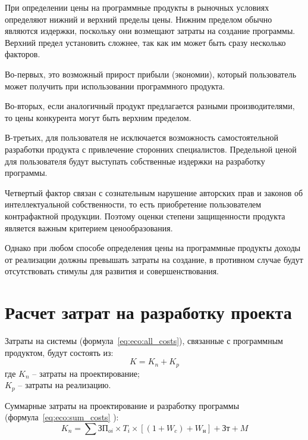 \documentclass[utf8,usehyperref,12pt]{G7-32}
\begin{document}
При определении цены на программные продукты в рыночных условиях определяют нижний и верхний пределы цены. Нижним пределом обычно являются издержки, поскольку они возмещают затраты на создание программы. Верхний предел установить сложнее, так как им может быть сразу несколько факторов.

Во-первых, это возможный прирост прибыли (экономии), который пользователь может получить при использовании программного продукта. 

Во-вторых, если аналогичный продукт предлагается разными производителями, то цены конкурента могут быть верхним пределом. 

В-третьих, для пользователя не исключается возможность самостоятельной разработки продукта с привлечение сторонних специалистов. Предельной ценой для пользователя будут выступать собственные издержки на разработку программы.

Четвертый фактор связан с сознательным нарушение авторских прав и законов об интеллектуальной собственности, то есть приобретение пользователем контрафактной продукции. Поэтому оценки степени защищенности продукта является важным критерием ценообразования.

Однако при любом способе определения цены на программные продукты доходы от реализации должны превышать затраты на создание, в противном случае будут отсутствовать стимулы для развития и совершенствования.

\section{Расчет затрат на разработку проекта}
Затраты на системы (формула~\ref{eq:eco:all_costs}), связанные с программным продуктом, будут состоять из:
\begin{equation}
  \label{eq:eco:all_costs}
  K = K_n + K_p
\end{equation}
где $K_n$ -- затраты на проектирование;\\$K_p$ -- затраты на реализацию.

Суммарные затраты на проектирование  и разработку программы (формула~\ref{eq:eco:sum_costs} ):
\begin{equation}
  \label{eq:eco:sum_costs}
  K_n = \sum ЗП_{oi} \times T_{i} \times [(1 + W_c) + W_н] + Зт + M
\end{equation}
\end{document}
